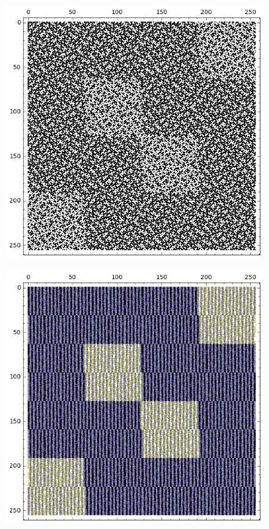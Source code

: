 \documentclass[12pt,a4paper]{article}
\begin{document}
\begin{figure}[!hb]
\centering
\begin{minipage}{.48\textwidth}
  \centering
  \includegraphics[width=.9\linewidth]{../matrix_plot/re8_4_weight_class_matrix.png}
  \label{fig:8_4_weight_class_matrix}
\end{minipage}%
\begin{minipage}{.48\textwidth}
  \centering
  \includegraphics[width=.9\linewidth]{../matrix_plot/re8_4_bent_cayley_graph_index_matrix.png}
  \label{fig:8_4_bent_cayley_graph_index_matrix}
\end{minipage}
\end{figure}
~
\end{document}
